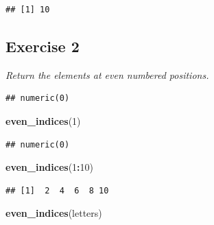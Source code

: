 \documentclass[
]{book}
\newenvironment{Shaded}{\begin{snugshade}}{\end{snugshade}}
\newcommand{\ControlFlowTok}[1]{\textcolor[rgb]{0.13,0.29,0.53}{\textbf{#1}}}
\newcommand{\DecValTok}[1]{\textcolor[rgb]{0.00,0.00,0.81}{#1}}
\newcommand{\KeywordTok}[1]{\textcolor[rgb]{0.13,0.29,0.53}{\textbf{#1}}}
\newcommand{\NormalTok}[1]{#1}
\newcommand{\OperatorTok}[1]{\textcolor[rgb]{0.81,0.36,0.00}{\textbf{#1}}}
\newcommand{\StringTok}[1]{\textcolor[rgb]{0.31,0.60,0.02}{#1}}
\begin{document}
\begin{verbatim}
## [1] 10
\end{verbatim}

\hypertarget{exercise-2}{%
\subsection{Exercise 2}\label{exercise-2}}

\emph{Return the elements at even numbered positions.}

\begin{Shaded}
\end{Shaded}

\begin{verbatim}
## numeric(0)
\end{verbatim}

\begin{Shaded}
\begin{Highlighting}[]
\KeywordTok{even_indices}\NormalTok{(}\DecValTok{1}\NormalTok{)}
\end{Highlighting}
\end{Shaded}

\begin{verbatim}
## numeric(0)
\end{verbatim}

\begin{Shaded}
\begin{Highlighting}[]
\KeywordTok{even_indices}\NormalTok{(}\DecValTok{1}\OperatorTok{:}\DecValTok{10}\NormalTok{)}
\end{Highlighting}
\end{Shaded}

\begin{verbatim}
## [1]  2  4  6  8 10
\end{verbatim}

\begin{Shaded}
\begin{Highlighting}[]
\KeywordTok{even_indices}\NormalTok{(letters)}
\end{Highlighting}
\end{Shaded}
\end{document}
